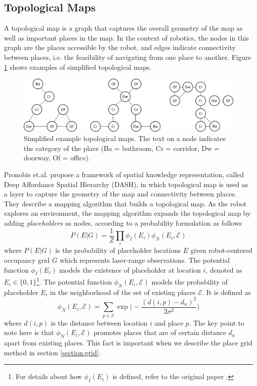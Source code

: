 \documentclass[10pt, titlepage]{article}
\theoremstyle{definition}
\begin{document}
\subsection{Topological Maps}\label{section:topomap}

A topological map is a graph that captures the overall geometry of the map as well as important places in the map. In the context of robotics, the nodes in this graph are the places accessible by the robot, and edges indicate connectivity between places, i.e. the feasibility of navigating from one place to another. Figure \ref{fig:topomap} shows examples of simplified topological maps.
\begin{figure}[!htb]
    \centering
    \captionsetup{width=.8\linewidth}
    \includegraphics[scale=0.5]{images/example_place_maps.png}
    \caption{Simplified example topological maps. The text on a node indicates the category of the place (Ba = bathroom, Cr = corridor, Dw = doorway, Of = office).}
    \label{fig:topomap}
\end{figure}

Pronobis et.al. \cite{pronobis2017deep} propose a framework of spatial knowledge representation, called Deep Affordance Spatial Hierarchy (DASH), in which topological map is used as a layer to capture the geometry of the map and connectivity between places. They describe a mapping algorithm that builds a topological map. As the robot explores an environment, the mapping algorithm expands the topological map by adding \textit{placeholders} \cite{pronobis2010representing} as nodes, according to a probability formulation as follows
\begin{equation}\label{eq:p_eg}
  P(E|G) = \frac{1}{Z}\prod_i\phi_I(E_i)\phi_N(E_i, \mathcal{E})
\end{equation}
where $P(E|G)$ is the probability of placeholder locations $E$ given robot-centered occupancy grid $G$ which represents laser-range observations. The potential function $\phi_I(E_i)$ models the existence of placeholder at location $i$, denoted as $E_i\in\{0,1\}$\footnote{For details about how $\phi_I(E_i)$ is defined, refer to the original paper \cite{pronobis2017deep}.}. The potential function $\phi_N(E_i, \mathcal{E})$ models the probability of placeholder $E_i$ in the neighborhood of the set of existing places $\mathcal{E}$. It is defined as
\begin{equation}\label{eq:phi_n}
  \phi_N(E_i, \mathcal{E}) = \sum_{p\in\mathcal{E}}\exp\Big(-\frac{(d(i,p)-d_n)^2}{2\sigma^2}\Big)
\end{equation}
where $d(i,p)$ is the distance between location $i$ and place $p$. The key point to note here is that $\phi_N(E_i, \mathcal{E})$ promotes places that are of certain distance $d_n$ apart from existing places. This fact is important when we describe the place grid method in section \ref{section:grid}.
\end{document}

